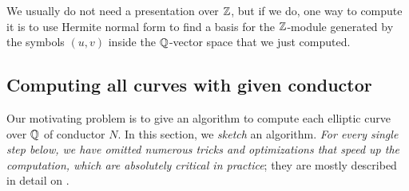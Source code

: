 \documentclass{book}
\begin{document}
We usually do not need a presentation over $\mathbb{Z}$, but
if we do, one way to compute it is to use Hermite normal form
to find a basis for the $\mathbb{Z}$-module
generated by the symbols $(u,v)$ inside the $\mathbb{Q}$-vector space
that we just computed.

\subsection{Computing all curves with given conductor}

Our motivating problem is to give an algorithm to compute
each elliptic curve over $\mathbb{Q}$ of conductor $N$.
In this section, we {\em sketch} an algorithm.
{\em For every single step below, we have omitted
numerous tricks and optimizations
that speed up the computation, which
are absolutely critical in practice}; they are mostly
described in detail on \cite{cremona:algs}.
\end{document}
